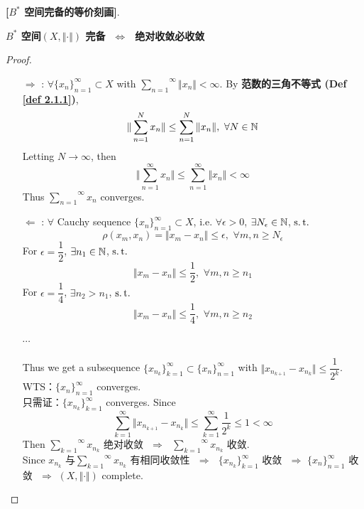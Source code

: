 	\begin{thm}\label{thm 2.1.2}
		\textbf{[$B^*$ 空间完备的等价刻画]}. 
		\begin{center}
			\textbf{$B^*$ 空间$(X , \Vert \cdot \Vert)$ 完备 $\,\, \Leftrightarrow \,\,$ 绝对收敛必收敛}
		\end{center}
		
		\vspace{3em}
		
		\begin{proof}
			\begin{enumerate}
				\item[$\Rightarrow$]: $\forall \{ x_n \}_{n = 1}^{\infty} \subset X$ with $\overset{\infty}{\underset{n = 1}{\sum}} \Vert x_n \Vert < \infty$. By \textbf{范数的三角不等式 (Def \ref{def 2.1.1})}, 
				\[ \Vert \sum_{n = 1}^{N} x_n \Vert \leq \sum_{n = 1}^{N} \Vert x_n \Vert , \,\, \forall N \in \mathbb{N} \]
				Letting $N \to \infty$, then
				\[ \Vert \sum_{n = 1}^{\infty} x_n \Vert \leq \sum_{n = 1}^{\infty} \Vert x_n \Vert < \infty \]
				Thus $\overset{\infty}{\underset{n = 1}{\sum}} x_n$ converges. 
				
				\vspace{4em}
				
				\item[$\Leftarrow$]: $\forall$ Cauchy sequence $\{ x_n \}_{n = 1}^{\infty} \subset X$, i.e. $\forall \epsilon > 0$, $\exists N_\epsilon \in \mathbb{N}$, $\operatorname{s.t.}$
				\[ \rho(x_m , x_n) = \Vert x_m - x_n \Vert \leq \epsilon , \,\, \forall m , n \geq N_\epsilon \]
				For $\epsilon = \dfrac{1}{2}$, $\exists n_1 \in \mathbb{N}$, $\operatorname{s.t.}$
				\[ \Vert x_m - x_n \Vert \leq \frac{1}{2} , \,\, \forall m , n \geq n_1 \]
				For $\epsilon = \dfrac{1}{4}$, $\exists n_2 > n_1$, $\operatorname{s.t.}$
				\[ \Vert x_m - x_n \Vert \leq \frac{1}{4} , \,\, \forall m , n \geq n_2 \]
				\begin{center}
					$\cdots$
				\end{center}
				Thus we get a subsequence $\{ x_{n_k} \}_{k = 1}^{\infty} \subset \{ x_n \}_{n = 1}^{\infty}$ with $\Vert x_{n_{k + 1}} - x_{n_k} \Vert \leq \dfrac{1}{2^k}$. \\
				WTS：$\{ x_n \}_{n = 1}^{\infty}$ converges. \\
				只需证：$\{ x_{n_k} \}_{k = 1}^{\infty}$ converges. Since
				\[ \sum_{k = 1}^{\infty} \Vert x_{n_{k + 1}} - x_{n_k} \Vert \leq \sum_{k = 1}^{\infty} \frac{1}{2^k} \leq 1 < \infty \]
				Then $\overset{\infty}{\underset{k = 1}{\sum}} x_{n_k}$ 绝对收敛 $\,\, \Rightarrow \,\,$ $\overset{\infty}{\underset{k = 1}{\sum}} x_{n_k}$ 收敛. \\
				Since $x_{n_k}$ 与$\overset{\infty}{\underset{k = 1}{\sum}} x_{n_k}$ 有相同收敛性 $\,\, \Rightarrow \,\,$ $\{ x_{n_k} \}_{k = 1}^{\infty}$ 收敛 $\,\, \Rightarrow \,\, \{ x_n \}_{n = 1}^{\infty}$ 收敛 $\,\, \Rightarrow \,\, (X , \Vert \cdot \Vert)$ complete.
			\end{enumerate}
		\end{proof}
	\end{thm}

